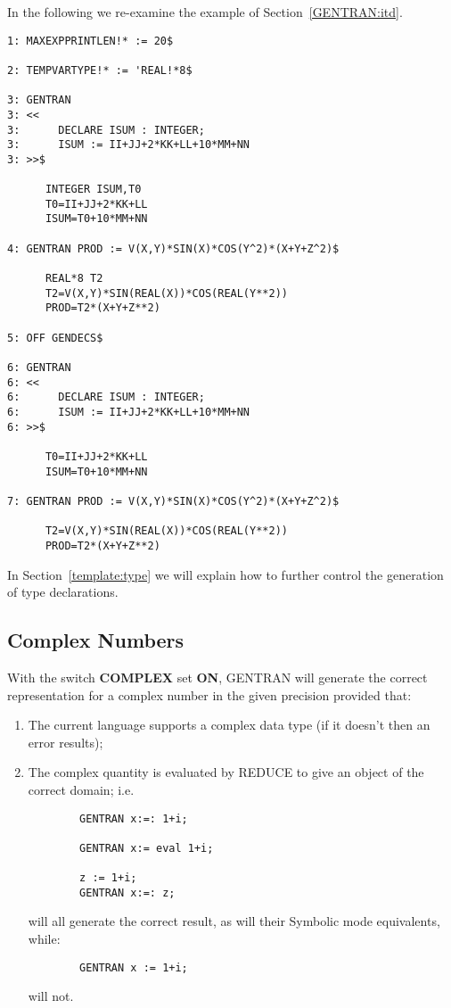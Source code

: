 In the following we re-examine the example of Section~\ref{GENTRAN:itd}.
\begin{describe}{\example}
\begin{verbatim}
1: MAXEXPPRINTLEN!* := 20$

2: TEMPVARTYPE!* := 'REAL!*8$

3: GENTRAN
3: <<
3:      DECLARE ISUM : INTEGER;
3:      ISUM := II+JJ+2*KK+LL+10*MM+NN
3: >>$

      INTEGER ISUM,T0
      T0=II+JJ+2*KK+LL
      ISUM=T0+10*MM+NN

4: GENTRAN PROD := V(X,Y)*SIN(X)*COS(Y^2)*(X+Y+Z^2)$

      REAL*8 T2
      T2=V(X,Y)*SIN(REAL(X))*COS(REAL(Y**2))
      PROD=T2*(X+Y+Z**2)

5: OFF GENDECS$

6: GENTRAN
6: <<
6:      DECLARE ISUM : INTEGER;
6:      ISUM := II+JJ+2*KK+LL+10*MM+NN
6: >>$

      T0=II+JJ+2*KK+LL
      ISUM=T0+10*MM+NN

7: GENTRAN PROD := V(X,Y)*SIN(X)*COS(Y^2)*(X+Y+Z^2)$

      T2=V(X,Y)*SIN(REAL(X))*COS(REAL(Y**2))
      PROD=T2*(X+Y+Z**2)
\end{verbatim}
\end{describe}

In Section~\ref{template:type} we will explain how to further control
the generation of type declarations.

\subsection{Complex Numbers}
\label{complex}  
With the switch {\bf COMPLEX} set {\bf ON}, GENTRAN will generate the
correct representation for a complex number in the given precision
provided that:

\begin{enumerate}
\item The current language supports a complex data type (if it doesn't then
an error results);
\item The complex quantity is evaluated by REDUCE
to give an object of the correct
domain; i.e.
\begin{verbatim}
        GENTRAN x:=: 1+i;

        GENTRAN x:= eval 1+i;

        z := 1+i;
        GENTRAN x:=: z;
\end{verbatim}
will all generate the correct result, as will their Symbolic mode equivalents,
while:
\begin{verbatim}
        GENTRAN x := 1+i;
\end{verbatim}
will not.
\end{enumerate}

